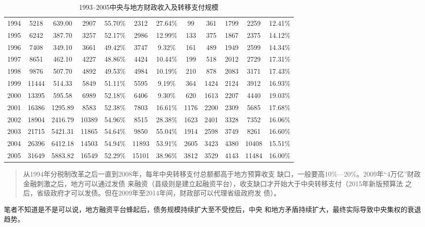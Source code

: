 \begin{table}[htbp]
{\begin{tabular}{@{}cccccccccccc@{}}
1994 & 5218  & 639.00  & 2907  & 55.70\% & 2312  & 27.64\% & 99   & 361  & 1799 & 2259  & 12.41\% \\
1995 & 6242  & 387.70  & 3257  & 52.17\% & 2986  & 12.99\% & 133  & 375  & 1867 & 2375  & 14.12\% \\
1996 & 7408  & 349.10  & 3661  & 49.42\% & 3747  & 9.32\%  & 161  & 489  & 1949 & 2599  & 14.34\% \\
1997 & 8651  & 462.10  & 4227  & 48.86\% & 4424  & 10.44\% & 199  & 518  & 2012 & 2729  & 17.31\% \\
1998 & 9876  & 507.70  & 4892  & 49.53\% & 4984  & 10.19\% & 210  & 878  & 2083 & 3171  & 17.43\% \\
1999 & 11444 & 514.33  & 5849  & 51.11\% & 5595  & 9.19\%  & 364  & 1424 & 2124 & 3912  & 16.93\% \\
2000 & 13395 & 595.58  & 6989  & 52.18\% & 6406  & 9.30\%  & 620  & 1613 & 2207 & 4440  & 19.03\% \\
2001 & 16386 & 1295.89 & 8583  & 52.38\% & 7803  & 16.61\% & 1176 & 2200 & 2309 & 5685  & 17.68\% \\
2002 & 18904 & 2416.79 & 10389 & 54.96\% & 8515  & 28.38\% & 1623 & 2401 & 3328 & 7352  & 16.06\% \\
2003 & 21715 & 5421.31 & 11865 & 54.64\% & 9850  & 55.04\% & 1914 & 2598 & 3749 & 8261  & 16.60\% \\
2004 & 26396 & 6412.18 & 14503 & 54.94\% & 11893 & 53.91\% & 2605 & 3423 & 4380 & 10408 & 15.51\% \\
2005 & 31649 & 5883.82 & 16549 & 52.29\% & 15101 & 38.96\% & 3812 & 3529 & 4143 & 11484 & 16.00\% \\ \bottomrule
\end{tabular}%
}
\StopDefiningTabulars
\caption{1993--2005中央与地方财政收入及转移支付规模}
\label{tab:zhuanyi}
\end{table}


\begin{quotation}
  从1994年分税制改革之后一直到2008年，每年中央转移支付总额都高于地方预算收支
  缺口，一般要高10\%—20\%。2009年“4万亿”财政金融刺激之后，地方可以通过发债
  来融资（县级则是建立起融资平台），收支缺口才开始大于中央转移支付（2015年新版预算法
  之后，省级政府才可以发债。但在2009年至2014年间，财政部可以代理省级政府发
  债）。\cite{zhishenshinei}
\end{quotation}

笔者不知道是不是可以说，地方融资平台蜂起后，债务规模持续扩大至不受控后，中央
和地方矛盾持续扩大，最终实际导致中央集权的衰退趋势。

